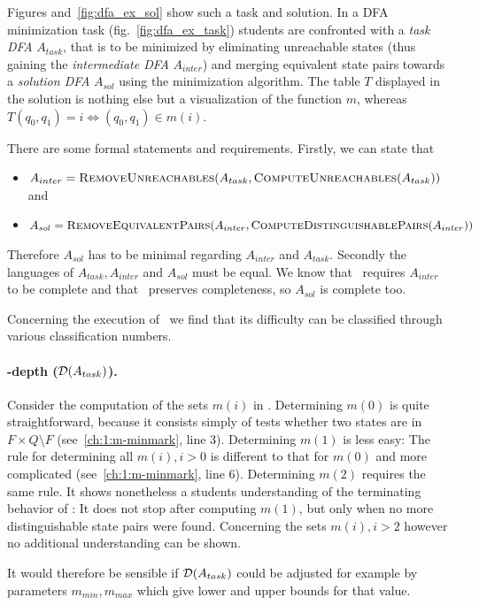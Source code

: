\noindent Figures and~\ref{fig:dfa_ex_sol} show such a task and solution. In a DFA minimization task (fig.~\ref{fig:dfa_ex_task}) students are confronted with a \emph{task DFA} $A_{task}$, that is to be minimized by eliminating unreachable states (thus gaining the \emph{intermediate DFA} $A_{inter}$) and merging equivalent state pairs towards a \emph{solution DFA} $A_{sol}$ using the minimization algorithm. The table $T$ displayed in the solution is nothing else but a visualization of the function $m$, whereas $T(q_0, q_1) = i \Leftrightarrow (q_0, q_1) \in m(i)$. 

There are some formal statements and requirements. Firstly, we can state that
\begin{itemize}
	\item $A_{inter} = \textsc{RemoveUnreachables}(A_{task}, \textsc{ComputeUnreachables}(A_{task}))$ and
	\item $A_{sol} = \textsc{RemoveEquivalentPairs}(A_{inter}, \textsc{ComputeDistinguishablePairs}(A_{inter}))$
\end{itemize}
Therefore $A_{sol}$ has to be minimal regarding $A_{inter}$ and $A_{task}$. Secondly the languages of $A_{task}, A_{inter}$ and $A_{sol}$ must be equal. We know that \CompDist\ requires $A_{inter}$ to be complete and that \RemEq\ preserves completeness, so $A_{sol}$ is complete too.

Concerning the execution of \MinAlg\ we find that its difficulty can be classified through various classification numbers.

\paragraph*{\CompDist-depth ($\mathcal{D}(A_{task})$).}

Consider the computation of the sets $m(i)$ in \CompDist. Determining $m(0)$ is quite straightforward, because it consists simply of tests whether two states are in $F \times Q \setminus F$ (see~\ref{ch:1:m-minmark}, line 3). Determining $m(1)$ is less easy: The rule for determining all $m(i), i > 0$ is different to that for $m(0)$ and more complicated (see~\ref{ch:1:m-minmark}, line 6). Determining $m(2)$ requires the same rule. It shows nonetheless a students understanding of the terminating behavior of \CompDist: It does not stop after computing $m(1)$, but only when no more distinguishable state pairs were found. Concerning the sets $m(i), i > 2$ however no additional understanding can be shown.

It would therefore be sensible if $\mathcal{D}(A_{task})$ could be adjusted for example by parameters $m_{min}, m_{max}$ which give lower and upper bounds for that value.


